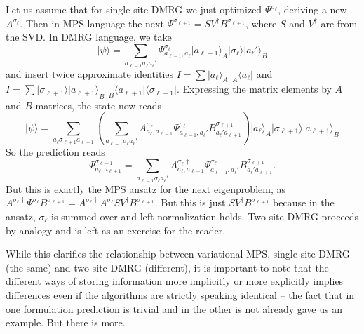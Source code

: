 \documentclass[a4paper,10pt,oneside,onecolumn,1p,times]{elsarticle}
\newcommand{\bra}[1]{\mbox{$\langle #1  |$}}
\newcommand{\ket}[1]{\mbox{$| #1  \rangle$}}
\begin{document}
Let us assume that for single-site DMRG we just optimized $\Psi^{\sigma_\ell}$, deriving a new $A^{\sigma_ \ell}$. Then in MPS language the next $\Psi^{\sigma_{\ell +1}}= SV^{\dagger} B^{\sigma_{\ell +1}}$, where $S$ and $V^\dagger$ are from the SVD. In DMRG language, we take
\begin{equation}
\ket{\psi} = \sum_{a_{\ell-1}\sigma_ \ell a_{\ell }'} \Psi^{\sigma_ \ell}_{a_{\ell-1}, a_{\ell }} \ket{a_{\ell-1}}_A \ket{\sigma_ \ell} \ket{a_{\ell}'}_B
\end{equation}
and insert twice approximate identities $I= \sum \ket{a_ \ell}_A\phantom\langle_A\bra{a_ \ell}$ and 
$I= \sum \ket{\sigma_{\ell +1}}\ket{a_{\ell+1}}_B \phantom\langle_B\bra{a_{\ell +1}} \bra{\sigma_{\ell+1}}$. Expressing the matrix elements by $A$ and $B$ matrices, the state now reads
\begin{equation}
\ket{\psi} = \sum_{a_\ell\sigma_{\ell +1} a_{\ell +1}} \left( \sum_{a_{\ell-1}\sigma_ \ell  a_{\ell}'} 
A^{\sigma_ \ell \dagger}_{a_ \ell,a_{\ell-1}} \Psi^{\sigma_ \ell}_{a_{\ell-1}, a_{\ell}'}  B^{\sigma_{\ell +1}}_{a_{\ell}' a_{\ell +1}} \right) 
\ket{a_{\ell}}_A \ket{\sigma_{\ell +1}} \ket{a_{\ell +1}}_B
\end{equation}
So the  prediction reads
\begin{equation}
\Psi^{\sigma_{\ell +1}}_{a_{\ell}, a_{\ell+1}} = 
\sum_{a_{\ell-1}\sigma_ \ell a_{\ell}'} 
A^{\sigma_ \ell \dagger}_{a_ \ell,a_{\ell-1}} \Psi^{\sigma_ \ell}_{a_{\ell-1}, a_{\ell}'}  B^{\sigma_{\ell +1}}_{a_{\ell}' a_{\ell +1}} .
\end{equation}
But this is exactly the MPS ansatz for the next eigenproblem, as $ A^{\sigma_ \ell \dagger} \Psi^{\sigma_ \ell}  B^{\sigma_{\ell +1}} =
A^{\sigma_ \ell \dagger} A^{\sigma_ \ell } S V^{\dagger} B^{\sigma_{\ell +1}}$. But this is just 
$S V^{\dagger} B^{\sigma_{\ell +1}}$ because in the ansatz, $\sigma_ \ell $ is summed over and left-normalization holds. Two-site DMRG proceeds by analogy and is left as an exercise for the reader.

While this clarifies the relationship between variational MPS, single-site DMRG (the same) and two-site DMRG (different), it is important to note that the different ways of storing information more implicitly or more explicitly implies differences even if the algorithms are strictly speaking identical -- the fact that in one formulation prediction is trivial and in the other is not already gave us an example. But there is more.
\end{document}
